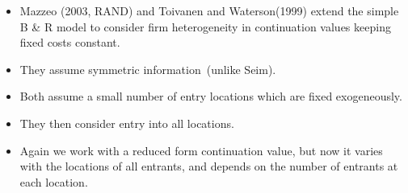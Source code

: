 \begin{frame}%


\begin{itemize}
\item Mazzeo (2003, RAND) and Toivanen and Waterson(1999) extend the simple
B \& R model to consider firm heterogeneity in continuation values keeping
fixed costs constant.

\item They assume symmetric information\ (unlike Seim).

\item Both assume a small number of entry locations which are fixed
exogeneously.

\item They then consider entry into all locations.

\item Again we work with a reduced form continuation value, but now it
varies with the locations of all entrants, and depends on the number of
entrants at each location.
\end{itemize}

\end{frame}%

